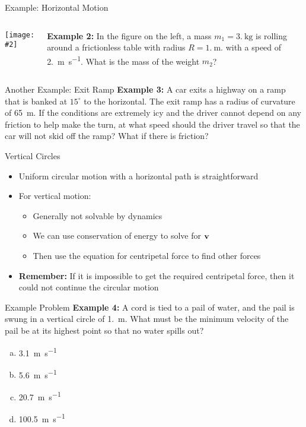 \documentclass[12pt,compress,aspectratio=169]{beamer}
\newcommand{\pic}[2]{\texttt{[image: \#2]}}
\newcommand{\mb}[1]{\ensuremath\mathbf{#1}}
\begin{document}
\begin{frame}{Example: Horizontal Motion}
  \begin{columns}
    \pic{1}{puck-on-table.png}
    
    \textbf{Example 2:} In the figure on the left, a mass
    $m_1=\SI{3.}{\kilo\gram}$ is rolling around a frictionless table with
    radius $R=\SI{1.}{\metre}$. with a speed of \SI{2.}{\metre\per\second}.
    What is the mass of the weight $m_2$?
  \end{columns}
\end{frame}


\begin{frame}{Another Example: Exit Ramp}
  \textbf{Example 3:} A car exits a highway on a ramp that is banked at
  $15^\circ$ to the horizontal. The exit ramp has a radius of curvature of
  \SI{65}{\metre}. If the conditions are extremely icy and the driver cannot
  depend on any friction to help make the turn, at what speed should the driver
  travel so that the car will not skid off the ramp? What if there is friction?
\end{frame}



\begin{frame}{Vertical Circles}
  \begin{itemize}
  \item Uniform circular motion with a horizontal path is straightforward
  \item For vertical motion:
    \begin{itemize}
    \item Generally not solvable by dynamics
    \item We can use conservation of energy to solve for $\mb{v}$
    \item Then use the equation for centripetal force to find other forces
    \end{itemize}
  \item\textbf{Remember:} If it is impossible to get the required centripetal
    force, then it could not continue the circular motion
  \end{itemize}
\end{frame}



\begin{frame}{Example Problem}
  \textbf{Example 4:} A cord is tied to a pail of water, and the pail is swung
  in a vertical circle of \SI{1.}{\metre}. What must be the minimum velocity of
  the pail be at its highest point so that no water spills out?

  \begin{enumerate}[(a)]
  \item\SI{3.1}{\metre\per\second}
  \item\SI{5.6}{\metre\per\second}
  \item\SI{20.7}{\metre\per\second}
  \item\SI{100.5}{\metre\per\second}
  \end{enumerate}
\end{frame}
\end{document}
